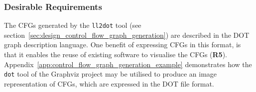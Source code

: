 
\subsubsection{Desirable Requirements}
\label{sec:eval_llvm_ir_library_desirable_requirements}


The CFGs generated by the \texttt{ll2dot} tool (see section~\ref{sec:design_control_flow_graph_generation}) are described in the DOT graph description language. One benefit of expressing CFGs in this format, is that it enables the reuse of existing software to visualise the CFGs (\textbf{R5}). Appendix~\ref{app:control_flow_graph_generation_example} demonstrates how the \texttt{dot} tool of the Graphviz project may be utilised to produce an image representation of CFGs, which are expressed in the DOT file format.
